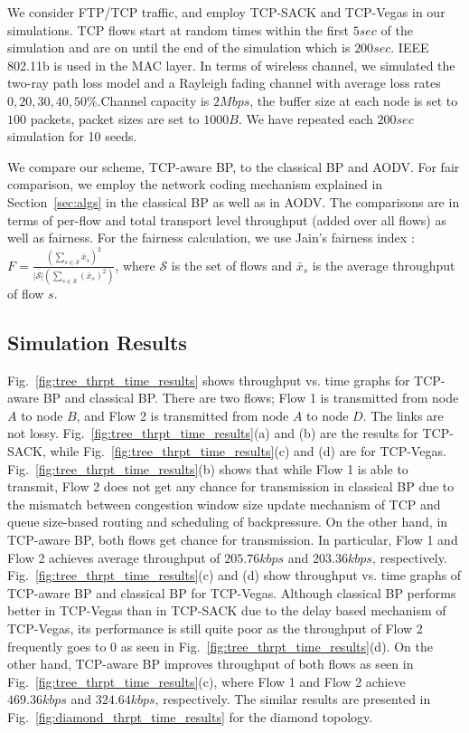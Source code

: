 \documentclass[conference]{IEEEtran}
\newcommand{\Sset}{\mathcal{S}}
\begin{document}
We consider FTP/TCP traffic, and employ TCP-SACK and TCP-Vegas in our simulations. TCP flows start at random times within the first $5sec$ of the simulation and are on until the end of the simulation which is $200sec$. IEEE 802.11b is used in the MAC layer. In terms of wireless channel, we simulated the two-ray path loss model and a Rayleigh fading channel with average loss rates $0, 20, 30, 40, 50 \%$.Channel capacity is $2Mbps$, the buffer size at each node is set to $100$ packets, packet sizes are set to $1000B$. We have repeated each $200sec$ simulation for 10 seeds.

We compare our scheme, TCP-aware BP, to the classical BP and AODV. For fair comparison, we employ the network coding mechanism explained in Section~\ref{sec:algs} in the classical BP as well as in AODV. The comparisons are in terms of per-flow and total transport level throughput (added over all flows) as well as fairness. For the fairness calculation, we use Jain's fairness index \cite{fairness_index}: $F = \frac{(\sum_{s \in \Sset} \bar{x}_s)^2}{|\Sset|(\sum_{s \in \Sset} (\bar{x}_s)^2)}$, where $\Sset$ is the set of flows and $\bar{x}_s$ is the average throughput of flow $s$.





\subsection{Simulation Results}

Fig.~\ref{fig:tree_thrpt_time_results} shows throughput vs. time graphs for TCP-aware BP and classical BP. There are two flows; Flow 1 is transmitted from node $A$ to node $B$, and Flow 2 is transmitted from node $A$ to node $D$. The links are not lossy. Fig.~\ref{fig:tree_thrpt_time_results}(a) and (b) are the results for TCP-SACK, while Fig.~\ref{fig:tree_thrpt_time_results}(c) and (d) are for TCP-Vegas. Fig.~\ref{fig:tree_thrpt_time_results}(b) shows that while Flow 1 is able to transmit, Flow 2 does not get any chance for transmission in classical BP due to the mismatch between congestion window size update mechanism of TCP and queue size-based routing and scheduling of backpressure. On the other hand, in TCP-aware BP, both flows get chance for transmission. In particular, Flow 1 and Flow 2 achieves average throughput of $205.76 kbps$ and $203.36 kbps$, respectively. Fig.~\ref{fig:tree_thrpt_time_results}(c) and (d) show throughput vs. time graphs of TCP-aware BP and classical BP for TCP-Vegas. Although classical BP performs better in TCP-Vegas than in TCP-SACK due to the delay based mechanism of TCP-Vegas, its performance is still quite poor as the throughput of Flow 2 frequently goes to 0 as seen in Fig.~\ref{fig:tree_thrpt_time_results}(d). On the other hand, TCP-aware BP improves throughput of both flows as seen in Fig.~\ref{fig:tree_thrpt_time_results}(c), where Flow 1 and Flow 2 achieve $469.36 kbps$ and $324.64 kbps$, respectively. The similar results are presented in Fig.~\ref{fig:diamond_thrpt_time_results} for the diamond topology.
\end{document}
